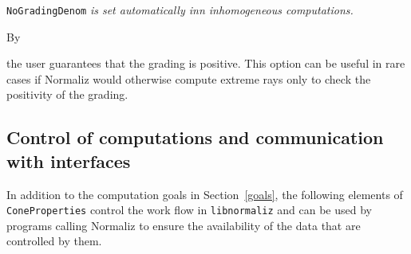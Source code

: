 \verb|NoGradingDenom| \emph{is set automatically inn inhomogeneous computations.}

By
\begin{itemize}
	\itemtt[GradingIsPositive]
\end{itemize}
the user guarantees that the grading is positive. This option can be useful in rare cases if Normaliz would otherwise compute extreme rays only to check the positivity of the grading.

\subsection{Control of computations and communication with interfaces}

In addition to the computation goals in Section~\ref{goals},
the following elements of \verb|ConeProperties| control the work flow in \verb|libnormaliz| and can be used by programs calling Normaliz to ensure the availability of the data that are controlled by them.

